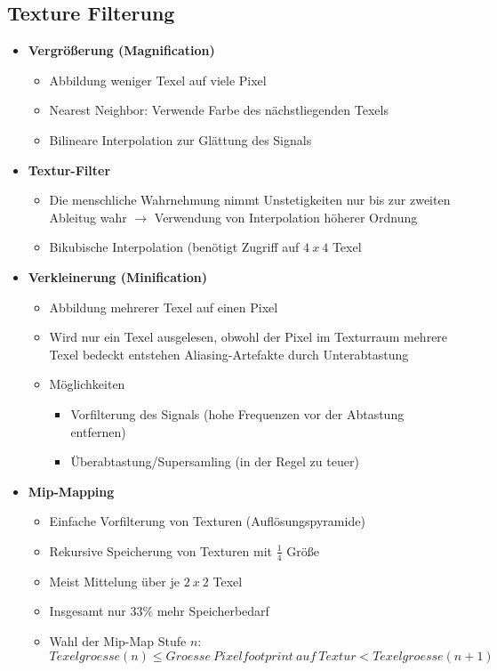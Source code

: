 \subsection{Texture Filterung}
\begin{itemize}
	\item \textbf{Vergrößerung (Magnification)}
	\begin{itemize}
		\item Abbildung weniger Texel auf viele Pixel
		\item Nearest Neighbor: Verwende Farbe des nächstliegenden Texels
		\item Bilineare Interpolation zur Glättung des Signals
	\end{itemize}
	\item \textbf{Textur-Filter}
	\begin{itemize}
		\item Die menschliche Wahrnehmung nimmt Unstetigkeiten nur bis zur zweiten Ableitug wahr \(\rightarrow\) Verwendung von Interpolation höherer Ordnung
		\item Bikubische Interpolation (benötigt Zugriff auf \(4~x~4\) Texel
	\end{itemize}
	\item \textbf{Verkleinerung (Minification)}
	\begin{itemize}
		\item Abbildung mehrerer Texel auf einen Pixel
		\item Wird nur ein Texel ausgelesen, obwohl der Pixel im Texturraum mehrere Texel bedeckt entstehen Aliasing-Artefakte durch Unterabtastung
		\item Möglichkeiten
		\begin{itemize}
			\item Vorfilterung des Signals (hohe Frequenzen vor der Abtastung entfernen)
			\item Überabtastung/Supersamling (in der Regel zu teuer)
		\end{itemize}
	\end{itemize}
	\item \textbf{Mip-Mapping}
	\begin{itemize}
		\item Einfache Vorfilterung von Texturen (Auflösungspyramide)
		\item Rekursive Speicherung von Texturen mit \(\frac{1}{4}\) Größe
		\item Meist Mittelung über je \(2~x~2\) Texel
		\item Insgesamt nur 33\% mehr Speicherbedarf
		\item Wahl der Mip-Map Stufe \(n\): \(Texelgroesse(n) \leq Groesse~Pixelfootprint~auf~Textur < Texelgroesse(n+1)\)

\end{itemize}
\end{itemize}
